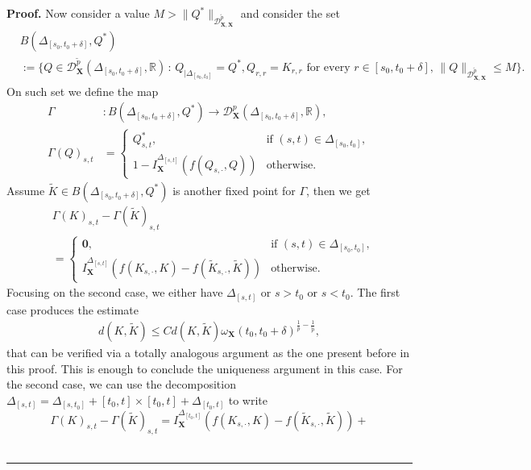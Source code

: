 \documentclass{article}%
\newenvironment{proof}[1][Proof]{\noindent\textbf{#1.} }{\ \rule{0.5em}{0.5em}}
\begin{document}
\begin{proof}
Now consider a value $M > \|Q^*\|_{\mathcal{D}^{\tilde{p}}_{ \mathbf{X}, \mathbf{X}}}$ and consider 
the set
\begin{align*}
&B(\Delta_{[s_0, t_0 + \delta]}, Q^*)\\
&:= \{ Q \in \mathcal{D}^{\tilde{p}}_{\mathbf{X}}(\Delta_{[s_0, t_0 + \delta]}, \mathbb{R}) \, : \, Q_{|\Delta_{[s_0, t_0]}} = Q^*, Q_{r,r} =  K_{r,r}  \text{ for every } r \in [s_0,t_0 + \delta],\, \|Q\|_{ \mathcal{D}^{\tilde{p}}_{ \mathbf{X}, \mathbf{X}}} \leq M \}.
\end{align*}
On such set we define the map
\begin{align*}
\Gamma &: B(\Delta_{[s_0, t_0 + \delta]}, Q^*) \longrightarrow \mathcal{D}^p_{\mathbf{X}}(\Delta_{[s_0, t_0 + \delta]}, \mathbb{R}), \\[4pt]
\Gamma(Q)_{s,t} &=
\begin{cases}
Q^*_{s,t}, & \text{if } (s,t) \in \Delta_{[s_0, t_0]}, \\[6pt]
1 -  I^{\Delta_{[s, t]}}_{\mathbf{X}}(f(Q_{s, \cdot},Q)) & \text{otherwise.}
\end{cases}
\end{align*}
Assume $\tilde{K} \in B(\Delta_{[s_0, t_0 + \delta]}, Q^*)$ is another fixed point for $\Gamma$, then we get
\begin{align*}
&\Gamma(K)_{s,t} - \Gamma(\tilde K)_{s,t}\\
&=
\begin{cases}
\mathbf{0}, & \text{if } (s,t) \in \Delta_{[s_0, t_0]}, \\[6pt]
\displaystyle
 I^{\Delta_{[s,t]}}_{\mathbf{X}}(f(K_{s, \cdot},K) - f(\tilde{K}_{s, \cdot},\tilde{K})) & \text{otherwise.}
\end{cases}
\end{align*}
Focusing on the second case,
we either have $\Delta_{[s,t]}$ or $s > t_0$ or $s < t_0$. The first case produces the estimate  
\begin{align*}
    d(K,\tilde{K}) \leq C
    d(K,\tilde{K})  \omega_{\mathbf{X}}(t_0, t_0+\delta)^{\frac{1}{p} - \frac{1}{\tilde{p}}},
\end{align*}
that can be verified via a totally analogous argument as the one present before in this proof. This is enough to conclude the uniqueness argument in this case.\newline
For the second case, we can use the decomposition $\Delta_{[s,t]} = \Delta_{[s, t_0]} + [t_0, t] \times [t_0, t] + \Delta_{[t_0, t]}$ to
write
\[ \Gamma(K)_{s,t} - \Gamma(\tilde K)_{s,t} = 
 I^{\Delta_{[t_0, t]}}_{\mathbf{X}}(f(K_{s, \cdot},K) - f(\tilde{K}_{s, \cdot},\tilde{K})) +
\]
\end{proof}
\end{document}
